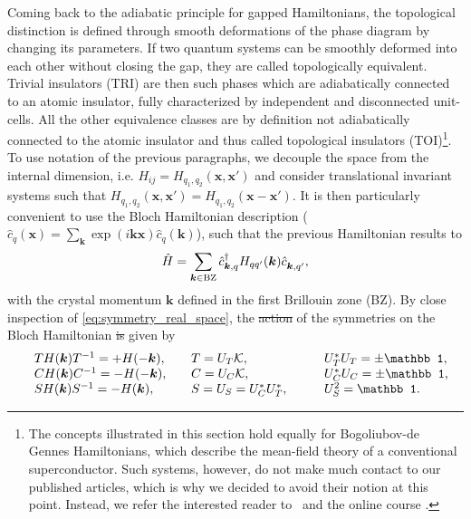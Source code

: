\documentclass{svmono}
\def\pdag{{\vphantom\dag}}
\providecommand{\DIFaddtex}[1]{{\protect\color{blue}\uwave{#1}}} %
\providecommand{\DIFdeltex}[1]{{\protect\color{red}\sout{#1}}}                      %
\providecommand{\DIFaddbegin}{} %
\providecommand{\DIFaddend}{} %
\providecommand{\DIFdelbegin}{} %
\providecommand{\DIFdelend}{} %
\providecommand{\DIFadd}[1]{\texorpdfstring{\DIFaddtex{#1}}{#1}} %
\providecommand{\DIFdel}[1]{\texorpdfstring{\DIFdeltex{#1}}{}} %
\newcommand{\DIFscaledelfig}{0.5}
\newlength{\DIFdelgraphicswidth} %
\newlength{\DIFdelgraphicsheight} %
\newcommand{\DIFaddincludegraphics}[2][]{{\color{blue}\fbox{\DIFOincludegraphics[#1]{#2}}}} %
\newcommand{\DIFdelincludegraphics}[2][]{%
\sbox{\DIFdelgraphicsbox}{\DIFOincludegraphics[#1]{#2}}%
\settoboxwidth{\DIFdelgraphicswidth}{\DIFdelgraphicsbox} %
\settoboxtotalheight{\DIFdelgraphicsheight}{\DIFdelgraphicsbox} %
\scalebox{\DIFscaledelfig}{%
\parbox[b]{\DIFdelgraphicswidth}{\usebox{\DIFdelgraphicsbox}\\[-\baselineskip] \rule{\DIFdelgraphicswidth}{0em}}\llap{\resizebox{\DIFdelgraphicswidth}{\DIFdelgraphicsheight}{%
\setlength{\unitlength}{\DIFdelgraphicswidth}%
\begin{picture}(1,1)%
\thicklines\linethickness{2pt} %
{\color[rgb]{1,0,0}\put(0,0){\framebox(1,1){}}}%
{\color[rgb]{1,0,0}\put(0,0){\line( 1,1){1}}}%
{\color[rgb]{1,0,0}\put(0,1){\line(1,-1){1}}}%
\end{picture}%
}\hspace*{3pt}}} %
} %
\DeclareRobustCommand{\DIFaddbegin}{\DIFOaddbegin \let\includegraphics\DIFaddincludegraphics} %
\DeclareRobustCommand{\DIFaddend}{\DIFOaddend \let\includegraphics\DIFOincludegraphics} %
\DeclareRobustCommand{\DIFdelbegin}{\DIFOdelbegin \let\includegraphics\DIFdelincludegraphics} %
\DeclareRobustCommand{\DIFdelend}{\DIFOaddend \let\includegraphics\DIFOincludegraphics} %
\begin{document}
Coming back to the adiabatic principle for gapped Hamiltonians, the topological distinction is defined through smooth deformations of the phase diagram by changing its parameters.
If two quantum systems can be smoothly deformed into each other without closing the gap, they are called topologically equivalent.
Trivial insulators (TRI) are then such phases which are adiabatically connected to an atomic insulator, fully characterized by independent and disconnected unit-cells.
All the other equivalence classes are by definition not adiabatically connected to the atomic insulator and thus called topological insulators (TOI)\footnote{The concepts illustrated in this section hold equally for Bogoliubov-de Gennes Hamiltonians, which describe the mean-field theory of a conventional superconductor. Such systems, however, do not make much contact to our published articles, which is why we decided to avoid their notion at this point. Instead, we refer the interested reader to~\cite{Chiu2016,Asboth2016} and the online course \cite{topocondmat}.}.
To use notation of the previous paragraphs, we decouple the space from the internal dimension, i.e. $H_{ij}=H_{q_1,q_2}(\bm x,\bm x')$ and consider translational invariant systems such that $H_{q_1,q_2}(\bm x,\bm x')=H_{q_1,q_2}(\bm x-\bm x')$.
It is then particularly convenient to use the Bloch Hamiltonian description (\DIFdelbegin \DIFdel{$\hat c_q(\bm x)=\sum_{\bm k}\exp(i\bm k\bm x)\hat c_q(\bm k)$}\DIFdelend \DIFaddbegin \DIFadd{$\hat c_{\bm x,q}=\sum_{\bm k}\exp(i\bm k\bm x)\hat c_{{\bm k},q}$}\DIFaddend ), such that the previous Hamiltonian results to
\DIFdelbegin %
\DIFdelend \DIFaddbegin \begin{align}
    \hat H = \sum_{\bm k\in {\rm BZ}} \hat c^\dag_{{\bm k},q} H_{qq'}(\bm k)\hat c^\pdag_{{\bm k},q'},
\end{align}\DIFaddend 
with the crystal momentum $\bm k$ defined in the first Brillouin zone (BZ).
By close inspection of \cref{eq:symmetry_real_space}, the \DIFdelbegin \DIFdel{action }\DIFdelend \DIFaddbegin \DIFadd{actions }\DIFaddend of the symmetries on the Bloch Hamiltonian \DIFdelbegin \DIFdel{is }\DIFdelend \DIFaddbegin \DIFadd{are }\DIFaddend given by
\begin{align}
    \begin{array}{l l l l }
        & TH(\bm k)T^{-1} = +H(-\bm k)
        ,\quad
        & T = U_T\mathcal K
        ,\quad
        & U_T^*U_T = \pm\mathbb1,\\
& CH(\bm k)C^{-1} = -H(-\bm k)
        ,\quad
        & C = U_C\mathcal K
        ,\quad
        & U_C^*U_C = \pm\mathbb1,\\
& SH(\bm k)S^{-1} = -H(\bm k)
        ,\quad
        & S = U_S = U_C^* U^*_T
        ,\qquad
        & U_S^2 = \mathbb1.
    \end{array}
    \label{eq:symmetry_momentum_space}
\end{align}
\end{document}
